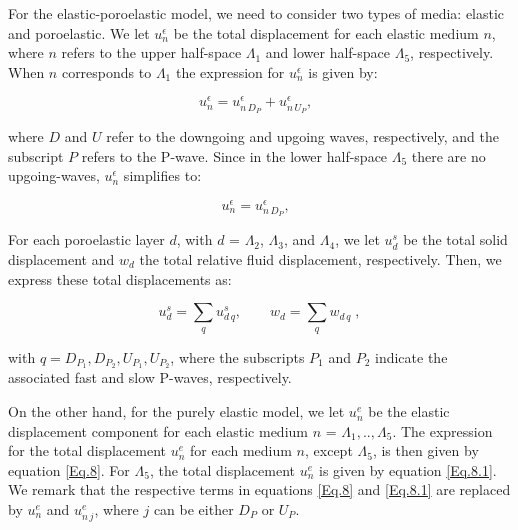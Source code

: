 \documentclass[draft]{agujournal2019}
\begin{document}
For the elastic-poroelastic model, we need to consider two types of media: elastic and poroelastic. We let $u_n^{\epsilon}$ be the total displacement for each elastic medium $n$, where  $n$ refers to the upper half-space $\Lambda_1$  and  lower half-space $\Lambda_5$, respectively. When $n$ corresponds to $\Lambda_1$ the expression for $u_n^{\epsilon}$ is given by:
\begin{linenomath*}
\begin{equation}\label{Eq.8}
u_n^{\epsilon} =  u_{n\,{D_P}}^{\epsilon}  + u_{n\,{U_P}}^{\epsilon} , \; \; 
\end{equation}
\end{linenomath*}
where $D$ and $U$ refer to the downgoing and upgoing waves, respectively, and the subscript $P$ refers to the P-wave. Since in the lower half-space $\Lambda_5$ there are no upgoing-waves, $u_n^{\epsilon}$ simplifies to:
\begin{linenomath*}
\begin{equation}\label{Eq.8.1}
u_n^{\epsilon} = u_{n\,{D_P}}^{\epsilon} , \; \; 
\end{equation}
\end{linenomath*}

For each poro\-elastic layer $d$, with $d$ = $\Lambda_2$, $\Lambda_3$, and $\Lambda_4$, we let
$u{_d^s}$ be the total solid displacement and $w_d$ the total relative fluid displacement, respectively. Then, we express these total displacements as:
\begin{linenomath*}
\begin{equation}\label{Eq.9}
u_d^s =  \sum_q u_{d \,q}^s ,   \qquad
w_d = \sum_q  w_{d \,q}  \;,
\end{equation}
\end{linenomath*}
with $q=D_{P_1},D_{P_2}, U_{P_1},U_{P_2}$, where the subscripts $P_1$ and $P_2$ indicate the associated fast and slow P-waves, respectively.

On the other hand, for the purely elastic model, we let $u_n^e$ be the elastic displacement component for each elastic medium $n$ = $\Lambda_1,.., \Lambda_5$. The expression for the total displacement $u_n^e$  for each medium $n$, except $\Lambda_5$, is then given by equation \eqref{Eq.8}. For $\Lambda_5$, the total displacement $u_n^e$ is given by equation \eqref{Eq.8.1}. We remark that the respective terms in equations \eqref{Eq.8} and \eqref{Eq.8.1} are replaced by $u_n^e$ and $u_{n\,j}^e$, where $j$ can be either $D_P$ or $U_P$.
\end{document}
